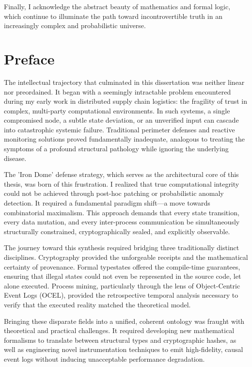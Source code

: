 Finally, I acknowledge the abstract beauty of mathematics and formal logic, which continue to illuminate the path toward incontrovertible truth in an increasingly complex and probabilistic universe.

\chapter*{Preface}
The intellectual trajectory that culminated in this dissertation was neither linear nor preordained. It began with a seemingly intractable problem encountered during my early work in distributed supply chain logistics: the fragility of trust in complex, multi-party computational environments. In such systems, a single compromised node, a subtle state deviation, or an unverified input can cascade into catastrophic systemic failure. Traditional perimeter defenses and reactive monitoring solutions proved fundamentally inadequate, analogous to treating the symptoms of a profound structural pathology while ignoring the underlying disease.

The 'Iron Dome' defense strategy, which serves as the architectural core of this thesis, was born of this frustration. I realized that true computational integrity could not be achieved through post-hoc patching or probabilistic anomaly detection. It required a fundamental paradigm shift---a move towards combinatorial maximalism. This approach demands that every state transition, every data mutation, and every inter-process communication be simultaneously structurally constrained, cryptographically sealed, and explicitly observable.

The journey toward this synthesis required bridging three traditionally distinct disciplines. Cryptography provided the unforgeable receipts and the mathematical certainty of provenance. Formal typestates offered the compile-time guarantees, ensuring that illegal states could not even be represented in the source code, let alone executed. Process mining, particularly through the lens of Object-Centric Event Logs (OCEL), provided the retrospective temporal analysis necessary to verify that the executed reality matched the theoretical model.

Bringing these disparate fields into a unified, coherent ontology was fraught with theoretical and practical challenges. It required developing new mathematical formalisms to translate between structural types and cryptographic hashes, as well as engineering novel instrumentation techniques to emit high-fidelity, causal event logs without inducing unacceptable performance degradation. 

